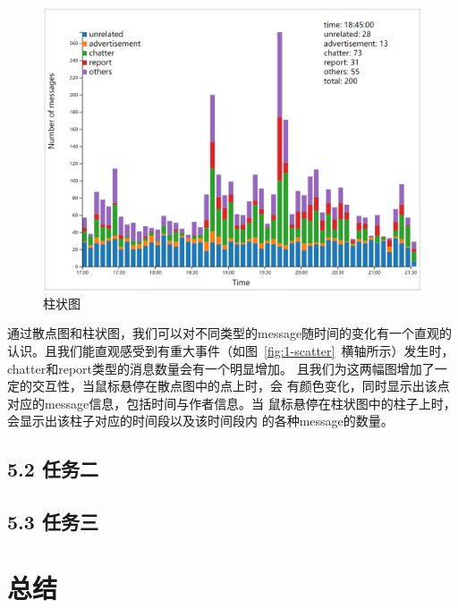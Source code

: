 \documentclass[a4paper]{article}
\begin{document}
\begin{figure}[H]
  \centering
  \includegraphics[width=1\textwidth]{images/1-bars-2.png}
  \caption{柱状图}\label{fig:1-bar}
  \vspace{\baselineskip}
\end{figure}
通过散点图和柱状图，我们可以对不同类型的message随时间的变化有一个直观的认识。且我们能直观感受到有重大事件（如图~\ref{fig:1-scatter}~横轴所示）发生时，
chatter和report类型的消息数量会有一个明显增加。
且我们为这两幅图增加了一定的交互性，当鼠标悬停在散点图中的点上时，会
有颜色变化，同时显示出该点对应的message信息，包括时间与作者信息。当
鼠标悬停在柱状图中的柱子上时，会显示出该柱子对应的时间段以及该时间段内
的各种message的数量。



\subsection*{ 5.2 任务二}
\subsection*{ 5.3 任务三}
\section{总结}


\end{document}
